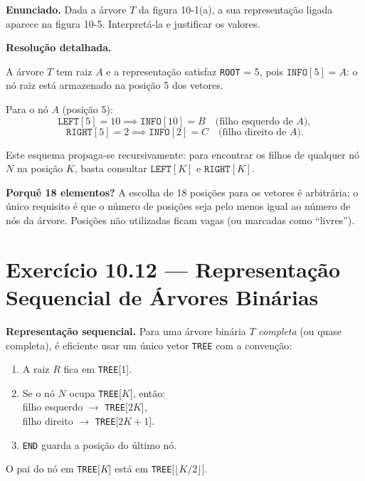 \documentclass[12pt,a4paper]{article}
\begin{document}
\medskip
\textbf{Enunciado.} Dada a árvore $T$ da figura 10-1(a), a sua representação ligada
aparece na figura 10-5. Interpretá-la e justificar os valores.

\medskip
\textbf{Resolução detalhada.}

A árvore $T$ tem raiz $A$ e a representação satisfaz \texttt{ROOT} = 5, pois
$\texttt{INFO}[5] = A$: o nó raiz está armazenado na posição 5 dos vetores.

Para o nó $A$ (posição 5):
\[
  \texttt{LEFT}[5] = 10 \implies \texttt{INFO}[10] = B \quad \text{(filho esquerdo de } A \text{)},
\]
\[
  \texttt{RIGHT}[5] = 2 \implies \texttt{INFO}[2] = C \quad \text{(filho direito de } A \text{)}.
\]

Este esquema propaga-se recursivamente: para encontrar os filhos de qualquer nó $N$
na posição $K$, basta consultar $\texttt{LEFT}[K]$ e $\texttt{RIGHT}[K]$.

\medskip
\noindent\textbf{Porquê 18 elementos?}
A escolha de 18 posições para os vetores é arbitrária; o único requisito é que o número
de posições seja pelo menos igual ao número de nós da árvore. Posições não utilizadas
ficam vagas (ou marcadas como ``livres'').

\section*{Exercício 10.12 — Representação Sequencial de Árvores Binárias}

\begin{teoriacaixa}
\textbf{Representação sequencial.}
Para uma árvore binária $T$ \emph{completa} (ou quase completa), é eficiente usar um
único vetor \texttt{TREE} com a convenção:
\begin{enumerate}[leftmargin=1.8em]
  \item A raiz $R$ fica em \texttt{TREE}[1].
  \item Se o nó $N$ ocupa \texttt{TREE}[$K$], então:\\
        filho esquerdo $\to$ \texttt{TREE}[$2K$],\\
        filho direito $\to$ \texttt{TREE}[$2K+1$].
  \item \texttt{END} guarda a posição do último nó.
\end{enumerate}
O pai do nó em \texttt{TREE}[$K$] está em \texttt{TREE}[$\lfloor K/2 \rfloor$].
\end{teoriacaixa}
\end{document}
